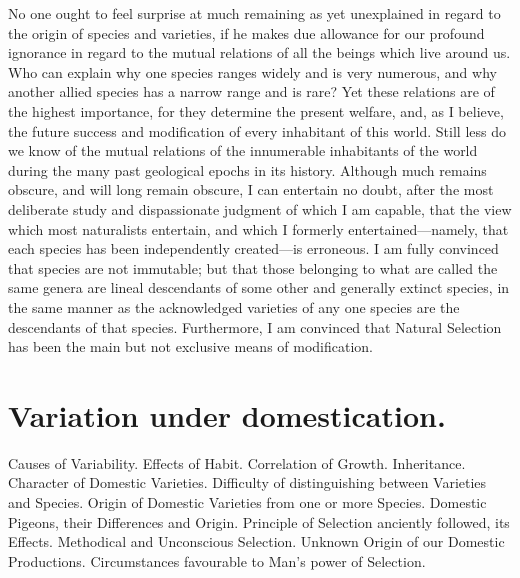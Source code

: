 \documentclass{book}
\begin{document}
No one ought to feel surprise at much remaining as yet unexplained in regard to
the origin of species and varieties, if he makes due allowance for our profound
ignorance in regard to the mutual relations of all the beings which live around
us. Who can explain why one species ranges widely and is very numerous, and why
another allied species has a narrow range and is rare? Yet these relations are
of the highest importance, for they determine the present welfare, and, as I
believe, the future success and modification of every inhabitant of this world.
Still less do we know of the mutual relations of the innumerable inhabitants of
the world during the many past geological epochs in its history. Although much
remains obscure, and will long remain obscure, I can entertain no doubt, after
the most deliberate study and dispassionate judgment of which I am capable,
that the view which most naturalists entertain, and which I formerly
entertained---namely, that each species has been independently
created---is erroneous. I am fully convinced that species are not
immutable; but that those belonging to what are called the same genera are
lineal descendants of some other and generally extinct species, in the same
manner as the acknowledged varieties of any one species are the descendants of
that species. Furthermore, I am convinced that Natural Selection has been the
main but not exclusive means of modification.

\chapter{Variation under domestication.}
\begin{em}
Causes of Variability. Effects of Habit. Correlation of Growth. Inheritance.
Character of Domestic Varieties. Difficulty of distinguishing between Varieties
and Species. Origin of Domestic Varieties from one or more Species. Domestic
Pigeons, their Differences and Origin. Principle of Selection anciently
followed, its Effects. Methodical and Unconscious Selection. Unknown Origin of
our Domestic Productions. Circumstances favourable to Man's power of
Selection.
\end{em}
\end{document}

